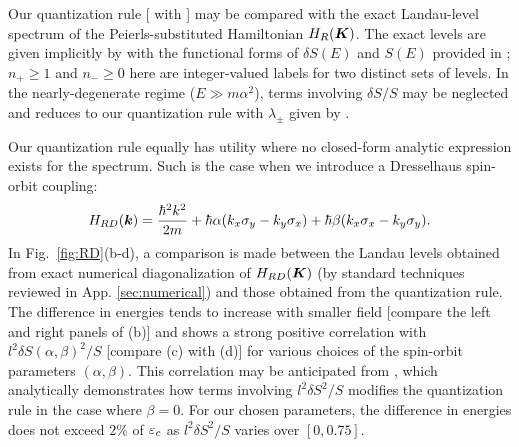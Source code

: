 \documentclass[aps, prb, showpacs, twocolumn, notitlepage, superscriptaddress]{revtex4-1}
\begin{document}

Our quantization rule [ with ] may be compared with the  exact Landau-level spectrum of the Peierls-substituted Hamiltonian $H_R(\boldsymbol{K})$. The exact levels are given implicitly by\cite{bychkov_oscillatory_1984}
with the functional forms of $\delta S(E)$ and $S(E)$ provided in ;  $n_{+}{\ge} 1$ and $n_-{\ge} 0$ here are integer-valued labels for two distinct sets of levels.  In the nearly-degenerate regime ($E{\gg}m\alpha^2$), terms involving $\delta S/S$ may be neglected and  reduces to our quantization rule with $\lambda_{\pm}$ given by .

Our quantization rule equally has utility where no closed-form analytic expression exists for the spectrum. Such is the case when we introduce a Dresselhaus spin-orbit coupling:
\begin{equation}
 H_{RD}(\boldsymbol{k})=\frac{{\hbar^2}k^2}{2m}+\hbar\alpha(k_{x}\sigma_{y}-k_{y}\sigma_{x})+\hbar\beta(k_{x}\sigma_{x}-k_{y}\sigma_{y}).\label{hamRD}
\end{equation}
In Fig.\ \ref{fig:RD}(b-d), a comparison is made between the Landau levels obtained from exact numerical diagonalization of $H_{RD}(\boldsymbol{K})$ (by standard techniques reviewed in App. \ref{sec:numerical}) and those obtained from the quantization rule. The difference in energies tends to increase with smaller field [compare the left and right panels of   (b)] and shows a strong positive correlation with $l^2\delta S(\alpha,\beta)^2/S$ [compare (c) with (d)] for various choices of the spin-orbit parameters $(\alpha,\beta)$. This correlation may be anticipated from , which analytically demonstrates how terms involving $l^2\delta S^2/S$ modifies the quantization rule in the case where $\beta{=}0$. For our chosen parameters,  the difference in energies does not exceed $2\%$ of $\varepsilon_c$ as $l^2\delta S^2/S$ varies over $[0,0.75]$.


\end{document}
